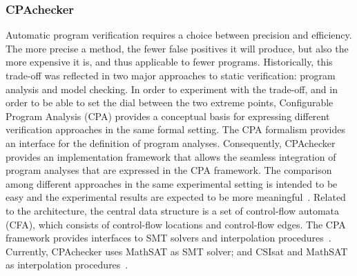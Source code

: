 \documentclass[10pt,conference]{IEEEtran}
\begin{document}
\subsubsection{CPAchecker}
Automatic program verification requires a choice between precision and efficiency. The
more precise a method, the fewer false positives it will produce, but also the more expensive it is, and thus applicable to fewer programs. Historically, this trade-off was
reflected in two major approaches to static verification: program analysis and model
checking. In order to experiment with the trade-off, and in order to be able to set the dial between the two extreme points, Configurable Program Analysis (CPA) provides a conceptual basis for expressing different verification approaches in the same formal setting. The CPA formalism provides an interface for the definition of program analyses. Consequently, CPAchecker provides an implementation framework that allows the seamless integration of program analyses that are expressed in the CPA framework. The comparison among different approaches in the same experimental setting is intended to be easy and the experimental results are expected to be more meaningful~\cite{Beyer2011}. Related to the architecture, the central data structure is a set of control-flow automata (CFA), which consists of control-flow locations and control-flow edges. The CPA framework provides interfaces to SMT solvers and interpolation procedures~\cite{Beyer2011}. Currently, CPAchecker uses MathSAT as SMT solver; and CSIsat and MathSAT as interpolation procedures~\cite{Beyer2011}. 

\end{document}
